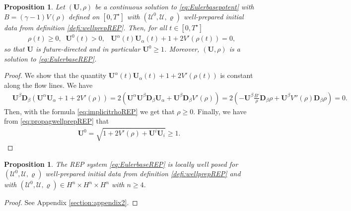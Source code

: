 \documentclass[a4paper, 15pt]{article}
\numberwithin{equation}{section}
\newtheorem{propal}[defi]{Proposition}
\begin{document}
\begin{propal}
\label{propal:propagwellprepREP}
    Let $(\textbf{U},\rho)$ be a continuous solution to \eqref{eq:Eulerbasepotent} with $B=(\gamma-1)V(\rho)$ defined on $[0,T^\star]$ with $(\mathscr{U}^0,\mathscr{U},\varrho)$ well-prepared initial data from definition \ref{defi:wellprepREP}.
    Then, for all $t\in[0,T^\star]$
     \begin{align}
     \label{eq:propagwellprepREP}
        &\rho(t)\geq0,\;\; \textbf{U}^0(t)>0, &\textbf{U}^\alpha(t) \textbf{U}_\alpha(t)+1+2V'(\rho(t))=0, 
    \end{align}
    so that $\textbf{U}$ is future-directed and in particular $\textbf{U}^0\geq 1$. Moreover, $(\textbf{U},\rho)$ is a solution to \eqref{eq:EulerbaseREP}.
\end{propal}
\begin{proof}
    We show that the quantity $\textbf{U}^\alpha(t) \textbf{U}_\alpha(t)+1+2V'(\rho(t))$ is constant along the flow lines. We have
    \begin{align*}
         &\textbf{U}^\beta\textbf{D}_\beta(\textbf{U}^\alpha \textbf{U}_\alpha+1+2V'(\rho))=2(\textbf{U}^\alpha \textbf{U}^\beta\textbf{D}_\beta \textbf{U}_\alpha+\textbf{U}^\beta\textbf{D}_\beta V'(\rho))=2( -\textbf{U}^\beta\frac{B'}{\rho}\textbf{D}_\beta \rho +\textbf{U}^\beta V''(\rho)\textbf{D}_\beta\rho )=0.
    \end{align*}
Then, with the formula \eqref{eq:implicitrhoREP} we get that $\rho\geq0$. Finally, we have from \eqref{eq:propagwellprepREP} that 
\begin{align}
\textbf{U}^0=\sqrt{1+2V'(\rho)+\textbf{U}^i\textbf{U}_i}\geq 1.
\end{align}
\end{proof}
\begin{propal}
    \label{propal:wellposedEulerEP}
   The REP system \eqref{eq:EulerbaseREP} is locally well posed for $(\mathscr{U}^0,\mathscr{U},\varrho)$ well-prepared initial data from definition \ref{defi:wellprepREP} and with $(\mathscr{U}^0,\mathscr{U},\varrho)\in H^n\times H^n\times H^n$ with $n\geq 4$.
\end{propal}
\begin{proof}
    See Appendix \ref{section:appendix2}.
\end{proof}
\end{document}

